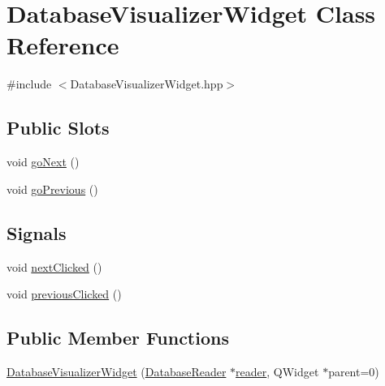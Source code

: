 \hypertarget{class_database_visualizer_widget}{\section{Database\+Visualizer\+Widget Class Reference}
\label{class_database_visualizer_widget}
}


{\ttfamily \#include $<$Database\+Visualizer\+Widget.\+hpp$>$}

\subsection*{Public Slots}
\begin{DoxyCompactItemize}
\item 
void \hyperlink{class_database_visualizer_widget_a62d817fd2c411ef3b75b470bf21af083}{go\+Next} ()
\item 
void \hyperlink{class_database_visualizer_widget_a89569bc1d41a136296036764ecd3ca8d}{go\+Previous} ()
\end{DoxyCompactItemize}
\subsection*{Signals}
\begin{DoxyCompactItemize}
\item 
void \hyperlink{class_database_visualizer_widget_a8a69ff90953c99721d955aa0055f2f3d}{next\+Clicked} ()
\item 
void \hyperlink{class_database_visualizer_widget_a89d24e3faedd247ea0e3cace2e72b9ce}{previous\+Clicked} ()
\end{DoxyCompactItemize}
\subsection*{Public Member Functions}
\begin{DoxyCompactItemize}
\item 
\hyperlink{class_database_visualizer_widget_af57da2fa08ee2d4f35821d1430cf57df}{Database\+Visualizer\+Widget} (\hyperlink{class_database_reader}{Database\+Reader} $\ast$\hyperlink{class_database_visualizer_widget_a37786e95a3407c3df7b4f2e94324b9e7}{reader}, Q\+Widget $\ast$parent=0)
\end{DoxyCompactItemize}
